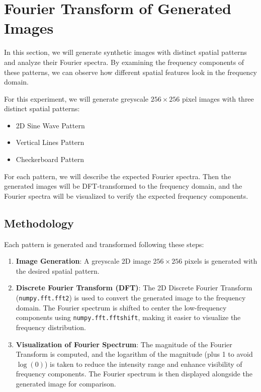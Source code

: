 \documentclass[a4paper,12pt]{article}
\begin{document}
\newpage

\section{Fourier Transform of Generated Images}

In this section, we will generate synthetic images with distinct spatial patterns and analyze their Fourier spectra. By examining the frequency components of these patterns, we can observe how different spatial features look in the frequency domain.

For this experiment, we will generate greyscale \(256 \times 256\) pixel images with three distinct spatial patterns:

\begin{itemize}
    \item 2D Sine Wave Pattern
    \item Vertical Lines Pattern
    \item Checkerboard Pattern
\end{itemize}

For each pattern, we will describe the expected Fourier spectra. Then the generated images will be DFT-transformed to the frequency domain, and the Fourier spectra will be visualized to verify the expected frequency components.

\subsection{Methodology}

Each pattern is generated and transformed following these steps:

\begin{enumerate}
    \item \textbf{Image Generation}:
        A greyscale 2D image \(256 \times 256\) pixels is generated with the desired spatial pattern.
    \item \textbf{Discrete Fourier Transform (DFT)}:
        The 2D Discrete Fourier Transform (\texttt{numpy.fft.fft2}) is used to convert the generated image to the frequency domain. The Fourier spectrum is shifted to center the low-frequency components using \texttt{numpy.fft.fftshift}, making it easier to visualize the frequency distribution.
    \item \textbf{Visualization of Fourier Spectrum}:
        The magnitude of the Fourier Transform is computed, and the logarithm of the magnitude (plus 1 to avoid \(\log(0)\)) is taken to reduce the intensity range and enhance visibility of frequency components. The Fourier spectrum is then displayed alongside the generated image for comparison.
\end{enumerate}
\end{document}

